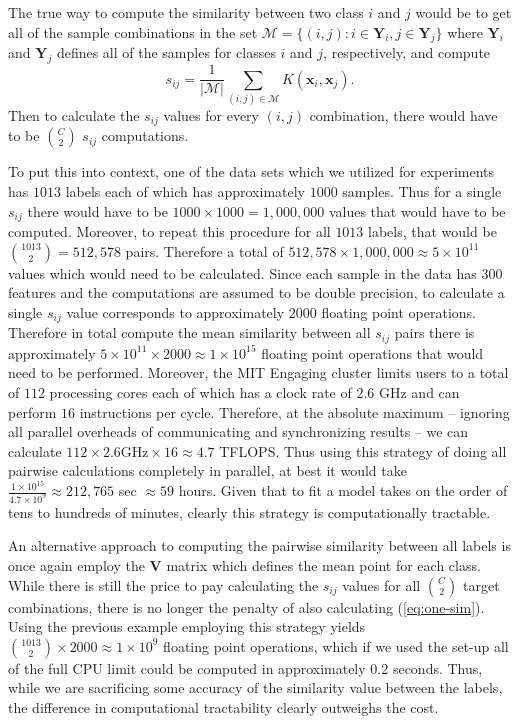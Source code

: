\documentclass[../thesis.tex]{subfiles}
\begin{document}
The true way to compute the similarity between two class $i$ and $j$ would be to get all of the sample combinations in the set $\mathcal{M} = \{(i, j): i \in \mathbf{Y}_i, j \in \mathbf{Y}_j\}$ where $\mathbf{Y}_i$ and $\mathbf{Y}_j$ defines all of the samples for classes $i$ and $j$, respectively, and compute
\begin{equation}
    \label{eq:one-sim}
    s_{ij} = \frac{1}{|\mathcal{M}|} \sum_{(i, j) \in \mathcal{M}} K(\mathbf{x}_i, \mathbf{x}_j).
\end{equation}
Then to calculate the $s_{ij}$ values for every $(i, j)$ combination, there would have to be $\binom{C}{2}$ $s_{ij}$ computations.

To put this into context, one of the data sets which we utilized for experiments has $1013$ labels each of which has approximately $1000$ samples. Thus for a single $s_{ij}$ there would have to be $1000 \times 1000 = 1,000,000$ values that would have to be computed. Moreover, to repeat this procedure for all $1013$ labels, that would be $\binom{1013}{2} = 512,578$ pairs. Therefore a total of $512,578 \times 1,000,000 \approx 5 \times 10^{11}$ values which would need to be calculated. Since each sample in the data has $300$ features and the computations are assumed to be double precision, to calculate a single $s_{ij}$ value corresponds to approximately $2000$ floating point operations. Therefore in total compute the mean similarity between all $s_{ij}$ pairs there is approximately $5 \times 10^{11} \times 2000 \approx 1 \times 10^{15}$ floating point operations that would need to be performed. Moreover, the MIT Engaging cluster limits users to a total of $112$ processing cores each of which has a clock rate of $2.6$ GHz and can perform $16$ instructions per cycle. Therefore, at the absolute maximum -- ignoring all parallel overheads of communicating and synchronizing results -- we can calculate $112 \times 2.6 \text{GHz} \times 16 \approx 4.7$ TFLOPS. Thus using this strategy of doing all pairwise calculations completely in parallel, at best it would take $\frac{1 \times 10^{15}}{4.7 \times 10^9} \approx 212,765$ sec $\approx 59$ hours. Given that to fit a model takes on the order of tens to hundreds of minutes, clearly this strategy is computationally tractable. 

An alternative approach to computing the pairwise similarity between all labels is once again employ the $\mathbf{V}$ matrix which defines the mean point for each class. While there is still the price to pay calculating the $s_{ij}$ values for all $\binom{C}{2}$ target combinations, there is no longer the penalty of also calculating (\ref{eq:one-sim}). Using the previous example employing this strategy yields $\binom{1013}{2} \times 2000 \approx 1 \times 10^9$ floating point operations, which if we used the set-up all of the full CPU limit could be computed in approximately $0.2$ seconds. Thus, while we are sacrificing some accuracy of the similarity value between the labels, the difference in computational tractability clearly outweighs the cost.
\end{document}
